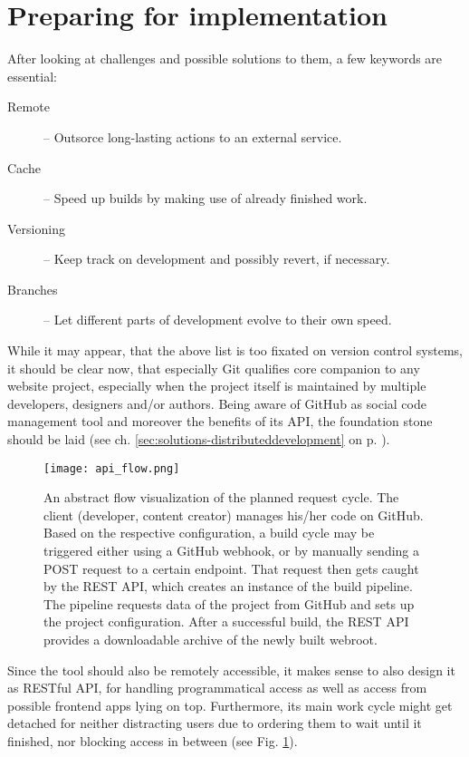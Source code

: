 \section{Preparing for implementation}
\label{sec:primarythoughts}

After looking at challenges and possible solutions to them, a few keywords are essential:

\begin{description}
  \item[Remote] -- Outsorce long-lasting actions to an external service.
  \item[Cache] -- Speed up builds by making use of already finished work.
  \item[Versioning] -- Keep track on development and possibly revert, if necessary.
  \item[Branches] -- Let different parts of development evolve to their own speed.
\end{description}

While it may appear, that the above list is too fixated on version control systems, it should be clear now, that especially Git qualifies core companion to any website project, especially when the project itself is maintained by multiple developers, designers and/or authors. Being aware of GitHub as social code management tool and moreover the benefits of its API, the foundation stone should be laid (see ch. \ref{sec:solutions-distributeddevelopment} on p. \pageref{sec:solutions-distributeddevelopment}).

\begin{figure} %
    \centering
    \texttt{[image: api\_flow.png]}
    \caption{An abstract flow visualization of the planned request cycle. The client (developer, content creator) manages his/her code on GitHub. Based on the respective configuration, a build cycle may be triggered either using a GitHub webhook, or by manually sending a POST request to a certain endpoint.    That request then gets caught by the REST API, which creates an instance of the build pipeline. The pipeline requests data of the project from GitHub and sets up the project configuration. After a successful build, the REST API provides a downloadable archive of the newly built webroot.}
    \label{fig:api-flow}
\end{figure}
%

Since the tool should also be remotely accessible, it makes sense to also design it as RESTful API, for handling programmatical access as well as access from possible frontend apps lying on top. Furthermore, its main work cycle might get detached for neither distracting users due to ordering them to wait until it finished, nor blocking access in between (see Fig. \ref{fig:api-flow}).

